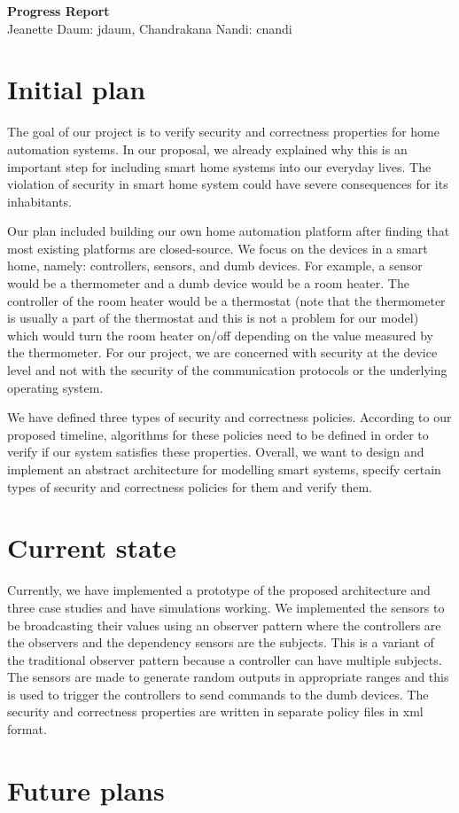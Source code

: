 \documentclass{article}
\begin{document}
\begin{center}
\large \textbf{Progress Report}\\
\normalsize {Jeanette Daum: jdaum, Chandrakana Nandi: cnandi}
\end{center}
\section{Initial plan}
The goal of our project is to verify security and correctness properties for home automation systems. In our proposal, we already explained why this is an important step for including smart home systems into our everyday lives. The violation of security in smart home system could have severe consequences for its inhabitants. 

Our plan included building our own home automation platform after finding that most existing platforms are closed-source. We focus on the devices in a smart home, namely: controllers, sensors, and dumb devices. For example, a sensor would be a thermometer and a dumb device would be a room heater. The controller of the room heater would be a thermostat (note that the thermometer is usually a part of the thermostat and this is not a problem for our model) which would turn the room heater on/off depending on the value measured by the thermometer. For our project, we are concerned with security at the device level and not with the security of the communication protocols or the underlying operating system. 

We have defined three types of security and correctness policies. According to our proposed timeline, algorithms for these policies need to be defined in order to verify if our system satisfies these properties. Overall, we want to design and implement an abstract architecture for modelling smart systems, specify certain types of security and correctness policies for them and verify them. 

\section{Current state}
Currently, we have implemented a prototype of the proposed architecture and three case studies and have simulations working. We implemented the sensors to be broadcasting their values using an observer pattern where the controllers are the observers and the dependency sensors are the subjects. This is a variant of the traditional observer pattern because a controller can have multiple subjects. The sensors are made to generate random outputs in appropriate ranges and this is used to trigger the controllers to send commands to the dumb devices. The security and correctness properties are written in separate policy files in xml format.  
\section{Future plans}
\end{document}
